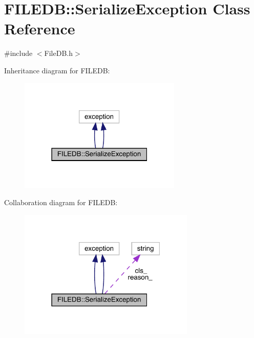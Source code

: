 \hypertarget{classFILEDB_1_1SerializeException}{}\section{F\+I\+L\+E\+DB\+:\+:Serialize\+Exception Class Reference}
\label{classFILEDB_1_1SerializeException}


{\ttfamily \#include $<$File\+D\+B.\+h$>$}



Inheritance diagram for F\+I\+L\+E\+DB\+:\nopagebreak
\begin{figure}[H]
\begin{center}
\leavevmode
\includegraphics[width=219pt]{d8/d5c/classFILEDB_1_1SerializeException__inherit__graph}
\end{center}
\end{figure}


Collaboration diagram for F\+I\+L\+E\+DB\+:\nopagebreak
\begin{figure}[H]
\begin{center}
\leavevmode
\includegraphics[width=238pt]{d2/de0/classFILEDB_1_1SerializeException__coll__graph}
\end{center}
\end{figure}
